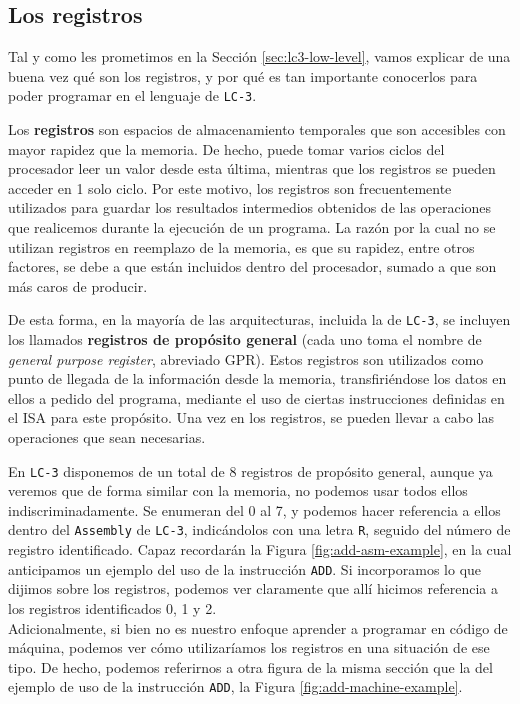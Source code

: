 \documentclass[a4paper, titlepage]{report}
\begin{document}
	\subsection{Los registros}
	\label{sec:registers}
	
	Tal y como les prometimos en la Sección \ref{sec:lc3-low-level}, vamos explicar de una buena vez qué son los registros, y por qué es tan importante conocerlos para poder programar en el lenguaje de \texttt{LC-3}.
	
	Los \textbf{registros} son espacios de almacenamiento temporales que son accesibles con mayor rapidez que la memoria. De hecho, puede tomar varios ciclos del procesador leer un valor desde esta última, mientras que los registros se pueden acceder en 1 solo ciclo. Por este motivo, los registros son frecuentemente utilizados para guardar los resultados intermedios obtenidos de las operaciones que realicemos durante la ejecución de un programa. La razón por la cual no se utilizan registros en reemplazo de la memoria, es que su rapidez, entre otros factores, se debe a que están incluidos dentro del procesador, sumado a que son más caros de producir.
	
	De esta forma, en la mayoría de las arquitecturas, incluida la de \texttt{LC-3}, se incluyen los llamados \textbf{registros de propósito general} (cada uno toma el nombre de \textit{general purpose register}, abreviado GPR). Estos registros son utilizados como punto de llegada de la información desde la memoria, transfiriéndose los datos en ellos a pedido del programa, mediante el uso de ciertas instrucciones definidas en el ISA para este propósito. Una vez en los registros, se pueden llevar a cabo las operaciones que sean necesarias.
	
	En \texttt{LC-3} disponemos de un total de 8 registros de propósito general, aunque ya veremos que de forma similar con la memoria, no podemos usar todos ellos indiscriminadamente. Se enumeran del 0 al 7, y podemos hacer referencia a ellos dentro del \texttt{Assembly} de \texttt{LC-3}, indicándolos con una letra \texttt{R}, seguido del número de registro identificado. Capaz recordarán la Figura \ref{fig:add-asm-example}, en la cual anticipamos un ejemplo del uso de la instrucción \texttt{ADD}. Si incorporamos lo que dijimos sobre los registros, podemos ver claramente que allí hicimos referencia a los registros identificados 0, 1 y 2.\\
	
	Adicionalmente, si bien no es nuestro enfoque aprender a programar en código de máquina, podemos ver cómo utilizaríamos los registros en una situación de ese tipo. De hecho, podemos referirnos a otra figura de la misma sección que la del ejemplo de uso de la instrucción \texttt{ADD}, la Figura \ref{fig:add-machine-example}.
	
\end{document}
